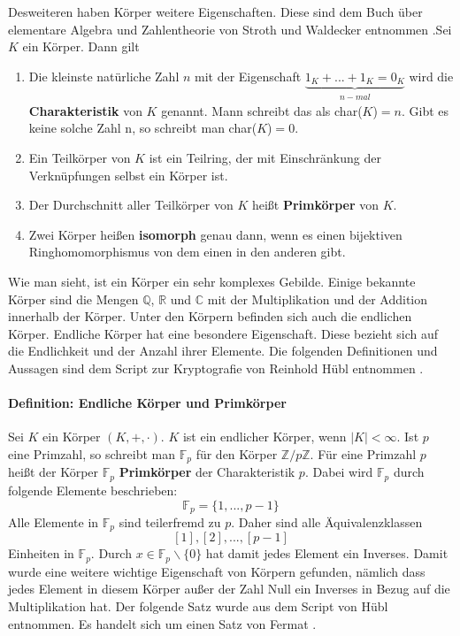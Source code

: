 Desweiteren haben Körper weitere Eigenschaften. Diese sind dem Buch über elementare Algebra und Zahlentheorie von Stroth und Waldecker entnommen \cite[S. 57-59]{Stroth.2019}.Sei $K$ ein Körper. Dann gilt
\begin{enumerate}
\item Die kleinste natürliche Zahl $n$ mit der Eigenschaft $\underbrace{1_{K} + ... + 1_{K} = 0_{K}}_{\substack{n-mal}}$ wird die \textbf{Charakteristik} von $K$ genannt. Mann schreibt das als char($K$)$ = n$. Gibt es keine solche Zahl n, so schreibt man char($K$)$ = 0$. 
\item Ein Teilkörper von $K$ ist ein Teilring, der mit Einschränkung der Verknüpfungen selbst ein Körper ist.
\item Der Durchschnitt aller Teilkörper von $K$ heißt  \textbf{Primkörper} von $K$.
\item Zwei Körper heißen  \textbf{isomorph} genau dann, wenn es einen bijektiven Ringhomomorphismus von dem einen in den anderen gibt.
\end{enumerate}

Wie man sieht, ist ein Körper ein sehr komplexes Gebilde. Einige bekannte Körper sind die Mengen $\mathbb{Q}$, $\mathbb{R}$ und $\mathbb{C}$ mit der Multiplikation und der Addition innerhalb der Körper. Unter den Körpern befinden sich auch die endlichen Körper. Endliche Körper hat eine besondere Eigenschaft. Diese bezieht sich auf die Endlichkeit und der Anzahl ihrer Elemente. Die folgenden Definitionen und Aussagen sind dem Script zur Kryptografie von Reinhold Hübl entnommen  \cite[S. 266]{Dr.ReinholdHubl.2022}.\\

\paragraph{Definition: Endliche Körper und Primkörper}
Sei $K$ ein Körper $(K,+,\cdot)$. $K$ ist ein endlicher Körper, wenn $\lvert K \rvert < \infty$. Ist $p$ eine Primzahl, so schreibt man $\mathbb{F}_p$ für den Körper $\mathbb{Z}/p\mathbb{Z}$. Für eine Primzahl $p$ heißt der Körper $\mathbb{F}_p$ \textbf{Primkörper} der Charakteristik $p$. Dabei wird $\mathbb{F}_p$ durch folgende Elemente beschrieben: $$\mathbb{F}_p =  \{1, ..., p - 1\}$$ Alle Elemente in $\mathbb{F}_p$ sind teilerfremd zu $p$. Daher sind alle Äquivalenzklassen $$[1], [2], ..., [p - 1]$$ Einheiten in $\mathbb{F}_p$. Durch $x \in \mathbb{F}_p \backslash \{0\}$ hat damit jedes Element ein Inverses. Damit wurde eine weitere wichtige Eigenschaft von Körpern gefunden, nämlich dass jedes Element in diesem Körper außer der Zahl Null ein Inverses in Bezug auf die Multiplikation hat. Der folgende Satz wurde aus dem Script von Hübl entnommen. Es handelt sich um einen Satz von Fermat \cite[S. 269]{Dr.ReinholdHubl.2022}.

